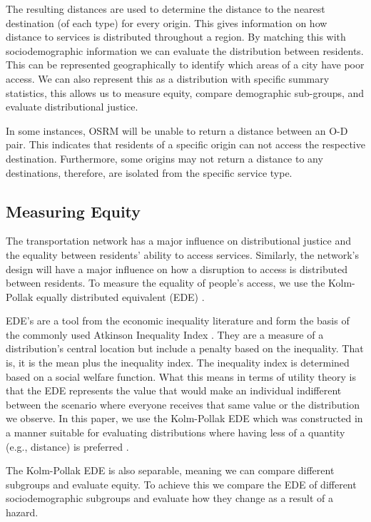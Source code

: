 \documentclass[review,3p,times,onecolumn,sort&compress,12pt]{elsarticle}
\let \cite \parencite
\begin{document}
The resulting distances are used to determine the distance to the nearest destination (of each type) for every origin.
This gives information on how distance to services is distributed throughout a region.
By matching this with sociodemographic information we can evaluate the distribution between residents. 
This can be represented geographically to identify which areas of a city have poor access.
We can also represent this as a distribution with specific summary statistics, this allows us to measure equity, compare demographic sub-groups, and evaluate distributional justice.

In some instances, OSRM will be unable to return a distance between an O-D pair.
This indicates that residents of a specific origin can not access the respective destination.
Furthermore, some origins may not return a distance to any destinations, therefore, are isolated from the specific service type.

\subsection{Measuring Equity}
The transportation network has a major influence on distributional justice and the equality between residents' ability to access services.
Similarly, the network's design will have a major influence on how a disruption to access is distributed between residents.
To measure the equality of people's access, we use the Kolm-Pollak equally distributed equivalent (EDE) \cite{sheriff2020health, Logan2021-ineq}. 

EDE's are a tool from the economic inequality literature and form the basis of the commonly used Atkinson Inequality Index \cite{Atkinson1970-mr}. 
They are a measure of a distribution's central location but include a penalty based on the inequality.
That is, it is the mean plus the inequality index.
The inequality index is determined based on a social welfare function. 
What this means in terms of utility theory is that the EDE represents the value that would make an individual indifferent between the scenario where everyone receives that same value or the distribution we observe.
In this paper, we use the Kolm-Pollak EDE which was constructed in a manner suitable for evaluating distributions where having less of a quantity (e.g., distance) is preferred \cite{sheriff2020health,Logan2021-ineq}.

The Kolm-Pollak EDE is also separable, meaning we can compare different subgroups and evaluate equity.
To achieve this we compare the EDE of different sociodemographic subgroups and evaluate how they change as a result of a hazard.
\end{document}
